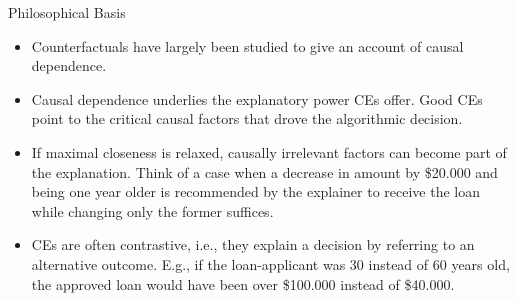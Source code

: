 \documentclass[11pt,compress,t,notes=noshow, aspectratio=169, xcolor=table]{beamer}
\begin{document}
\begin{vbframe}{Philosophical Basis}
	\begin{itemize}
	\item Counterfactuals have largely been studied to give an account of causal dependence.
		\item Causal dependence underlies the explanatory power CEs offer. Good CEs point to the critical causal factors that drove the algorithmic decision.
		\item If maximal closeness is relaxed, causally irrelevant factors can become part of the explanation. Think of a case when a decrease in amount by \$20.000 and being one year older is recommended by the explainer to receive the loan while changing only the former suffices.
		\item CEs are often contrastive, i.e., they explain a decision by referring to an alternative outcome. E.g., if the loan-applicant was 30 instead of 60 years old, the approved loan would have been over \$100.000 instead of \$40.000.%
	\end{itemize}
\end{vbframe}

\end{document}
